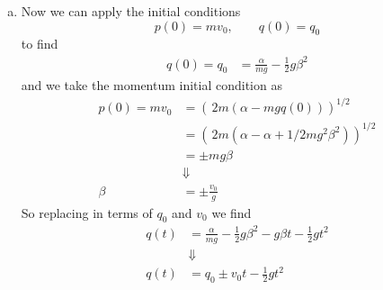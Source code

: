 \documentclass[11pt]{article}
\numberwithin{equation}{section}
\begin{document}
\begin{enumerate}[(a)]
\item Now we can apply the initial conditions 
$$p(0) = mv_0,\qquad q(0)=q_0$$
to find
\begin{align*}
q(0) = q_0 &= \frac{\alpha}{mg} - \frac{1}{2}g\beta^2
\end{align*}
and we take the momentum initial condition as
\begin{align*}
p(0) = mv_0 &= \left(\frac{}{}2m(\alpha-mgq(0))\right)^{1/2}\\
&= \left(\frac{}{}2m(\alpha-\alpha+1/2mg^2\beta^2)\right)^{1/2}\\
&= \pm mg\beta\\
&\Downarrow\\
\beta &= \pm\frac{v_0}{g}
\end{align*}
So replacing in terms of $q_0$ and $v_0$ we find
\begin{align*}
q(t) &=  \frac{\alpha}{mg} - \frac{1}{2}g\beta^2 - g\beta{t} - \frac{1}{2}gt^2\\
&\Downarrow\\
q(t) &= q_0 \pm v_0{t} - \frac{1}{2}gt^2
\end{align*}
\end{enumerate}

\pagebreak
\end{document}
